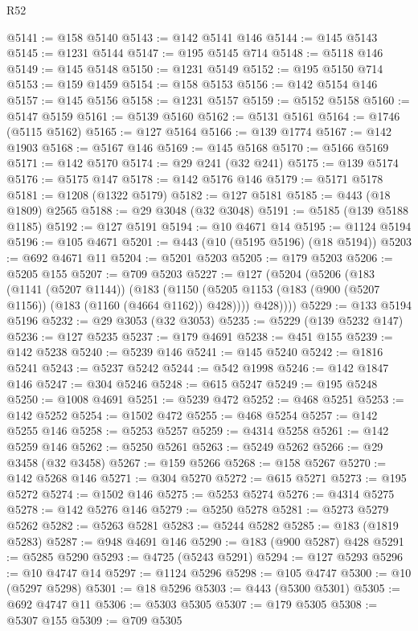 \begin{lexlean}{R52}
\begin{coremodule}
@5141 := @158 @5140
@5143 := @142 @5141 @146
@5144 := @145 @5143
@5145 := @1231 @5144
@5147 := @195 @5145 @714
@5148 := @5118 @146
@5149 := @145 @5148
@5150 := @1231 @5149
@5152 := @195 @5150 @714
@5153 := @159 @1459
@5154 := @158 @5153
@5156 := @142 @5154 @146
@5157 := @145 @5156
@5158 := @1231 @5157
@5159 := @5152 @5158
@5160 := @5147 @5159
@5161 := @5139 @5160
@5162 := @5131 @5161
@5164 := @1746 (@5115 @5162)
@5165 := @127 @5164
@5166 := @139 @1774
@5167 := @142 @1903
@5168 := @5167 @146
@5169 := @145 @5168
@5170 := @5166 @5169
@5171 := @142 @5170
@5174 := @29 @241 (@32 @241)
@5175 := @139 @5174
@5176 := @5175 @147
@5178 := @142 @5176 @146
@5179 := @5171 @5178
@5181 := @1208 (@1322 @5179)
@5182 := @127 @5181
@5185 := @443 (@18 @1809) @2565
@5188 := @29 @3048 (@32 @3048)
@5191 := @5185 (@139 @5188 @1185)
@5192 := @127 @5191
@5194 := @10 @4671 @14
@5195 := @1124 @5194
@5196 := @105 @4671
@5201 := @443 (@10 (@5195 @5196) (@18 @5194))
@5203 := @692 @4671 @11
@5204 := @5201 @5203
@5205 := @179 @5203
@5206 := @5205 @155
@5207 := @709 @5203
@5227 := @127
    (@5204
      (@5206
        (@183
          (@1141 (@5207 @1144))
          (@183
            (@1150 (@5205 @1153 (@183 (@900 (@5207 @1156)) (@183 (@1160 (@4664 @1162)) @428))))
            @428))))
@5229 := @133 @5194 @5196
@5232 := @29 @3053 (@32 @3053)
@5235 := @5229 (@139 @5232 @147)
@5236 := @127 @5235
@5237 := @179 @4691
@5238 := @451 @155
@5239 := @142 @5238
@5240 := @5239 @146
@5241 := @145 @5240
@5242 := @1816 @5241
@5243 := @5237 @5242
@5244 := @542 @1998
@5246 := @142 @1847 @146
@5247 := @304 @5246
@5248 := @615 @5247
@5249 := @195 @5248
@5250 := @1008 @4691
@5251 := @5239 @472
@5252 := @468 @5251
@5253 := @142 @5252
@5254 := @1502 @472
@5255 := @468 @5254
@5257 := @142 @5255 @146
@5258 := @5253 @5257
@5259 := @4314 @5258
@5261 := @142 @5259 @146
@5262 := @5250 @5261
@5263 := @5249 @5262
@5266 := @29 @3458 (@32 @3458)
@5267 := @159 @5266
@5268 := @158 @5267
@5270 := @142 @5268 @146
@5271 := @304 @5270
@5272 := @615 @5271
@5273 := @195 @5272
@5274 := @1502 @146
@5275 := @5253 @5274
@5276 := @4314 @5275
@5278 := @142 @5276 @146
@5279 := @5250 @5278
@5281 := @5273 @5279 @5262
@5282 := @5263 @5281
@5283 := @5244 @5282
@5285 := @183 (@1819 @5283)
@5287 := @948 @4691 @146
@5290 := @183 (@900 @5287) @428
@5291 := @5285 @5290
@5293 := @4725 (@5243 @5291)
@5294 := @127 @5293
@5296 := @10 @4747 @14
@5297 := @1124 @5296
@5298 := @105 @4747
@5300 := @10 (@5297 @5298)
@5301 := @18 @5296
@5303 := @443 (@5300 @5301)
@5305 := @692 @4747 @11
@5306 := @5303 @5305
@5307 := @179 @5305
@5308 := @5307 @155
@5309 := @709 @5305

\end{coremodule}
\end{lexlean}
